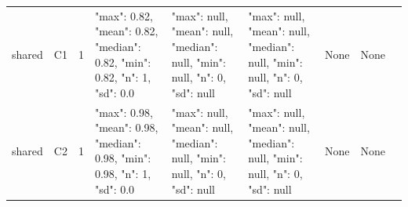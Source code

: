 \begin{tabular}{lllllllll}
shared & C1 & 1 & {"max": 0.82, "mean": 0.82, "median": 0.82, "min": 0.82, "n": 1, "sd": 0.0} & {"max": null, "mean": null, "median": null, "min": null, "n": 0, "sd": null} & {"max": null, "mean": null, "median": null, "min": null, "n": 0, "sd": null} & None & None & {} \\
shared & C2 & 1 & {"max": 0.98, "mean": 0.98, "median": 0.98, "min": 0.98, "n": 1, "sd": 0.0} & {"max": null, "mean": null, "median": null, "min": null, "n": 0, "sd": null} & {"max": null, "mean": null, "median": null, "min": null, "n": 0, "sd": null} & None & None & {} \\
\end{tabular}